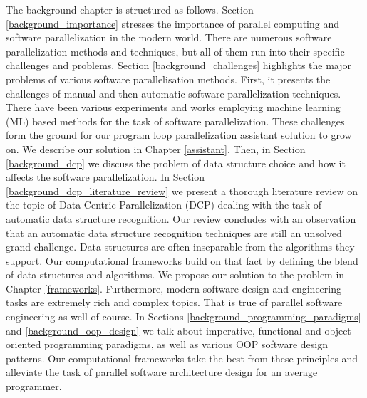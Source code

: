 % 
%
\quad The background chapter is structured as follows. Section \ref{background_importance} stresses the importance of parallel computing and software parallelization in the modern world. There are numerous software parallelization methods and techniques, but all of them run into their specific challenges and problems. Section \ref{background_challenges} highlights the major problems of various software parallelisation methods. First, it presents the challenges of manual and then automatic software parallelization techniques. There have been various experiments and works employing machine learning (ML) based methods \cite{ml-oboyle} for the task of software parallelization. These challenges form the ground for our program loop parallelization assistant solution \cite{assistant-aiseps} to grow on. We describe our solution in Chapter \ref{assistant}. Then, in Section \ref{background_dcp} we discuss the problem of data structure choice and how it affects the software parallelization. In Section \ref{background_dcp_literature_review} we present a thorough literature review on the topic of Data Centric Parallelization (DCP) dealing with the task of automatic data structure recognition. Our review concludes with an observation that an automatic data structure recognition techniques are still an unsolved grand challenge. Data structures are often inseparable from the algorithms they support. Our computational frameworks build on that fact by defining the blend of data structures and algorithms. We propose our solution to the problem in Chapter \ref{frameworks}. Furthermore, modern software design and engineering tasks are extremely rich and complex topics. That is true of parallel software engineering as well of course. In Sections \ref{background_programming_paradigms} and \ref{background_oop_design} we talk about imperative, functional and object-oriented programming paradigms, as well as various OOP software design patterns. Our computational frameworks take the best from these principles and alleviate the task of parallel software architecture design for an average programmer.
